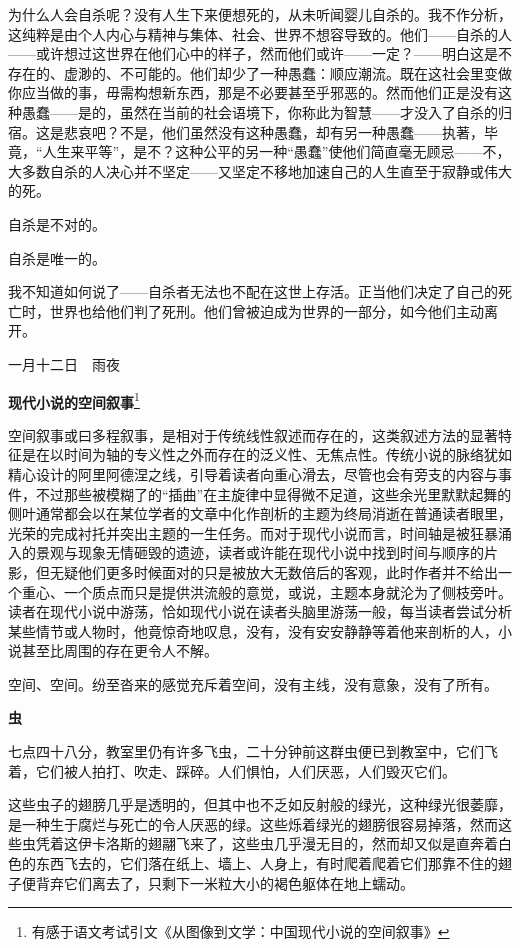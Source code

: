 \documentclass{ctexbook}
\begin{document}
    为什么人会自杀呢？没有人生下来便想死的，从未听闻婴儿自杀的。我不作分析，这纯粹是由个人内心与精神与集体、社会、世界不想容导致的。他们——自杀的人——或许想过这世界在他们心中的样子，然而他们或许——一定？——明白这是不存在的、虚渺的、不可能的。他们却少了一种愚蠢：顺应潮流。既在这社会里变做你应当做的事，毋需构想新东西，那是不必要甚至乎邪恶的。然而他们正是没有这种愚蠢——是的，虽然在当前的社会语境下，你称此为智慧——才没入了自杀的归宿。这是悲哀吧？不是，他们虽然没有这种愚蠢，却有另一种愚蠢——执著，毕竟，“人生来平等”，是不？这种公平的另一种“愚蠢”使他们简直毫无顾忌——不，大多数自杀的人决心并不坚定——又坚定不移地加速自己的人生直至于寂静或伟大的死。

    自杀是不对的。

    自杀是唯一的。

    我不知道如何说了——自杀者无法也不配在这世上存活。正当他们决定了自己的死亡时，世界也给他们判了死刑。他们曾被迫成为世界的一部分，如今他们主动离开。


\mbox


    \hfill 一月十二日\ \ 雨夜

\newpage
\textbf{现代小说的空间叙事}\footnote{\normalsize 有感于语文考试引文《从图像到文学：中国现代小说的空间叙事》}


\mbox


    空间叙事或曰多程叙事，是相对于传统线性叙述而存在的，这类叙述方法的显著特征是在以时间为轴的专义性之外而存在的泛义性、无焦点性。传统小说的脉络犹如精心设计的阿里阿德涅之线，引导着读者向重心滑去，尽管也会有旁支的内容与事件，不过那些被模糊了的“插曲”在主旋律中显得微不足道，这些余光里默默起舞的侧叶通常都会以在某位学者的文章中化作剖析的主题为终局消逝在普通读者眼里，光荣的完成衬托并突出主题的一生任务。而对于现代小说而言，时间轴是被狂暴涌入的景观与现象无情砸毁的遗迹，读者或许能在现代小说中找到时间与顺序的片影，但无疑他们更多时候面对的只是被放大无数倍后的客观，此时作者并不给出一个重心、一个质点而只是提供洪流般的意觉，或说，主题本身就沦为了侧枝旁叶。读者在现代小说中游荡，恰如现代小说在读者头脑里游荡一般，每当读者尝试分析某些情节或人物时，他竟惊奇地叹息，没有，没有安安静静等着他来剖析的人，小说甚至比周围的存在更令人不解。

    空间、空间。纷至沓来的感觉充斥着空间，没有主线，没有意象，没有了所有。

\newpage
\textbf{虫}


\mbox


    七点四十八分，教室里仍有许多飞虫，二十分钟前这群虫便已到教室中，它们飞着，它们被人拍打、吹走、踩碎。人们惧怕，人们厌恶，人们毁灭它们。

    这些虫子的翅膀几乎是透明的，但其中也不乏如反射般的绿光，这种绿光很萎靡，是一种生于腐烂与死亡的令人厌恶的绿。这些烁着绿光的翅膀很容易掉落，然而这些虫凭着这伊卡洛斯的翅翮飞来了，这些虫几乎漫无目的，然而却又似是直奔着白色的东西飞去的，它们落在纸上、墙上、人身上，有时爬着爬着它们那靠不住的翅子便背弃它们离去了，只剩下一米粒大小的褐色躯体在地上蠕动。
\end{document}
